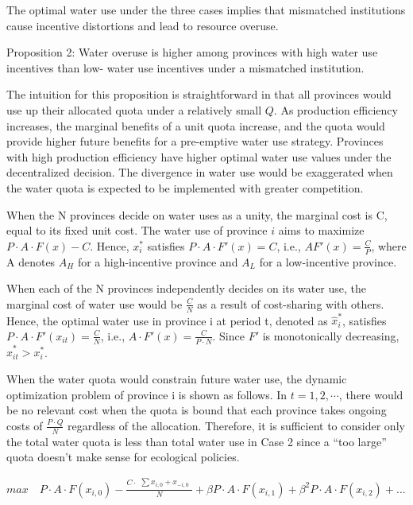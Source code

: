 \documentclass[preprint, 12pt]{elsarticle}
\begin{document}
The optimal water use under the three cases implies that mismatched institutions cause incentive distortions and lead to resource overuse.


Proposition 2: Water overuse is higher among provinces with high water use incentives than low- water use incentives under a mismatched institution.

The intuition for this proposition is straightforward in that all provinces would use up their allocated quota under a relatively small $Q$. As production efficiency increases, the marginal benefits of a unit quota increase, and the quota would provide higher future benefits for a pre-emptive water use strategy. Provinces with high production efficiency have higher optimal water use values under the decentralized decision. The divergence in water use would be exaggerated when the water quota is expected to be implemented with greater competition.





When the N provinces decide on water uses as a unity, the marginal cost is C, equal to its fixed unit cost.
The water use of province $i$ aims to maximize $P\cdot A\cdot F(x)-C$.
Hence, $x_i^*$ satisfies $P \cdot A\cdot F'(x)=C$, i.e., $AF'(x)=\frac{C}{P}$, where A denotes $A_H$ for a high-incentive province and $A_L$ for a low-incentive province.

When each of the N provinces independently decides on its water use, the marginal cost of water use would be $\frac{C}{N}$ as a result of cost-sharing with others.
Hence, the optimal water use in province i at period t, denoted as $\hat x_i^*$, satisfies $P \cdot A \cdot F'(x_{it})=\frac{C}{N}$, i.e., $A \cdot F'(x)=\frac{C}{P \cdot N}$.
Since $F'$ is monotonically decreasing, $\hat x_{it}^*>x_i^*$.

When the water quota would constrain future water use, the dynamic optimization problem of province i is shown as follows. In $t=1,2,\cdots$, there would be no relevant cost when the quota is bound that each province takes ongoing costs of $\frac{P \cdot Q}{N}$ regardless of the allocation. Therefore, it is sufficient to consider only the total water quota is less than total water use in Case 2 since a ``too large'' quota doesn't make sense for ecological policies.

$max  \quad P \cdot A \cdot F(x_{i,0})-\frac{C \cdot \begin{matrix} \sum x_{i,0} + x_{-i,0} \end{matrix}}{N}+\beta P \cdot A \cdot F(x_{i,1})+\beta^2 P \cdot A \cdot F(x_{i,2})+...$
\end{document}
